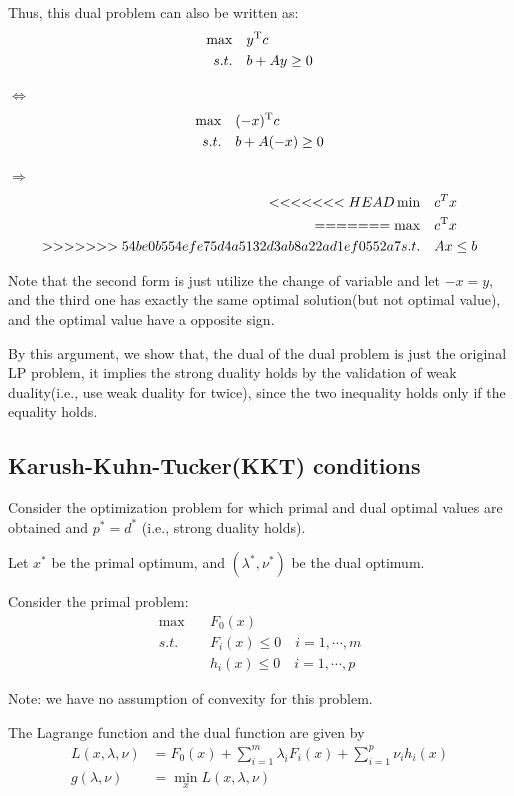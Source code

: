 Thus, this dual problem can also be written as:
\begin{align*}
\max\quad &y^{{\rm T}}c\\
s.t.\quad &b+Ay \geq 0
\end{align*}

$\Leftrightarrow$
\begin{align*}
\max\quad &(-x)^{{\rm T}}c\\
s.t.\quad &b+A(-x) \geq 0
\end{align*}

$\Rightarrow$
\begin{align*}
<<<<<<< HEAD
\min\quad &c^Tx\\
=======
\max\quad &c^{{\rm T}}x\\
>>>>>>> 54be0b554efe75d4a5132d3ab8a22ad1ef0552a7
s.t.\quad &Ax \leq b
\end{align*}

Note that the second form is just utilize the change of variable and let $-x=y$, and the third one has exactly the same optimal solution(but not optimal value), and the optimal value have a opposite sign.

By this argument, we show that, the dual of the dual problem is just the original LP problem, it implies the strong duality holds by the validation of weak duality(i.e., use weak duality for twice), since the two inequality holds only if the equality holds.


\subsection{Karush-Kuhn-Tucker(KKT) conditions}
Consider the optimization problem for which primal and dual optimal values are obtained and $p^*=d^*$ (i.e., strong duality holds).

Let $x^*$ be the primal optimum, and $(\lambda^*,\nu^*)$ be the dual optimum.

Consider the primal problem:
\begin{align*}
\max\quad &F_0(x)\\
s.t.\quad &F_i(x)\leq 0\quad i = 1,\cdots,m\\
&h_i(x)\leq 0\quad i = 1,\cdots,p
\end{align*}

Note: we have no assumption of convexity for this problem.

The Lagrange function and the dual function are given by 
\begin{align*}
L(x,\lambda,\nu) &= F_0(x)+\sum^m_{i=1}\lambda_iF_i(x) + \sum^p_{i=1}\nu_ih_i(x)\\
g(\lambda,\nu)&= \min_xL(x,\lambda,\nu)
\end{align*}

